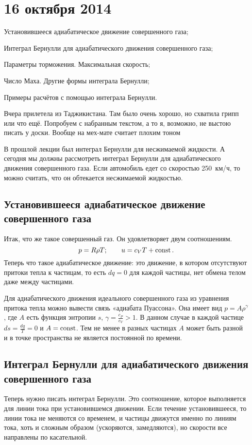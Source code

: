 \section{16 октября 2014}
\begin{roItems}
\item Установившееся адиабатическое движение совершенного газа;
\item Интеграл Бернулли для адиабатического движения совершенного газа;
\item Параметры торможения. Максимальная скорость;
\item Число Маха. Другие формы интеграла Бернулли;
\item Примеры расчётов с помощью интеграла Бернулли.
\end{roItems}

Вчера прилетела из Таджикистана. Там было очень хорошо, но схватила грипп или что ещё. Попробуем с набранным текстом, а то я, возможно, не выстою писать у доски. Вообще на мех-мате считает плохим тоном 

В прошлой лекции был интеграл Бернулли для несжимаемой жидкости. А сегодня мы должны рассмотреть интеграл Бернулли для адиабатического движения совершенного газа. Если автомобиль едет со скоростью 250~км/ч, то можно считать, что он обтекается несжимаемой жидкостью.

\subsection{Установившееся адиабатическое движение совершенного газа}
Итак, что же такое совершенный газ. Он удовлетворяет двум соотношениям.
\begin{equation}
  p = R\rho T;\qquad u = c_VT+\operatorname{const}.
\end{equation}
Теперь что такое адиабатическое движение: это движение, в котором отсутствуют притоки тепла к частицам, то есть $dq=0$ для каждой частицы, нет обмена телом даже между частицами.

Для адиабатического движения идеального совершенного газа из уравнения притока тепла можно вывести связь «адиабата Пуассона». 
Она имеет вид $p=A\rho^\gamma$, где $A$ есть функция энтропии $s$, $\gamma=\frac{c_P}{c_V}>1$.
 В данном случае в каждой частице $ds=\frac{dq}T=0$ и $A=\operatorname{const}$.
 Тем не менее в разных частицах $A$ может быть разной и в точке пространства не является постоянной по времени.

\subsection{Интеграл Бернулли для адиабатического движения совершенного газа}
Теперь нужно писать интеграл Бернулли. Это соотношение, которое выполняется для линии тока при установившемся движении.
Если течение установившееся, то линии тока не меняются со временем, и частицы движутся именно по линиям тока, хоть и сложным образом (ускоряются, замедляются), но скорости все направлены по касательной.

